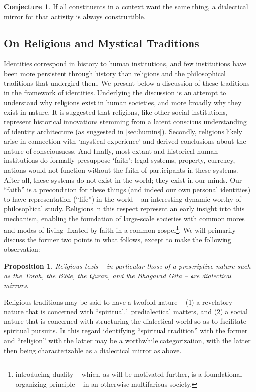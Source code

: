 \documentclass[pra,twocolumn,groupedaddress,10pt]{revtex4}
\newtheorem{proposition}[theorem]{Proposition}
\theoremstyle{definition}
\newtheorem{conjecture}[theorem]{Conjecture}
\begin{document}
\begin{conjecture}
	If all constituents in a context want the same thing, a dialectical mirror for that activity is always constructible.
\end{conjecture}

\subsection{On Religious and Mystical Traditions} \label{sec:phirelhistra}

Identities correspond in history to human institutions, and few institutions have been more persistent through history than religions and the philosophical traditions that undergird them. We present below a discussion of these traditions in the framework of identities. Underlying the discussion is an attempt to understand why religions exist in human societies, and more broadly why they exist in nature. It is suggested that religions, like other social institutions, represent historical innovations stemming from a latent conscious understanding of identity architecture (as suggested in \autoref{sec:humins}). Secondly, religions likely arise in connection with `mystical experience' and derived conclusions about the nature of consciousness. And finally, most extant and historical human institutions do formally presuppose `faith': legal systems, property, currency, nations would not function without the faith of participants in these systems. After all, these systems do not exist in the world; they exist in our minds. Our ``faith'' is a precondition for these things (and indeed our own personal identities) to have representation (``life'') in the world -- an interesting dynamic worthy of philosophical study. Religions in this respect represent an early insight into this mechanism, enabling the foundation of large-scale societies with common mores and modes of living, fixated by faith in a common gospel\footnote{introducing duality -- which, as will be motivated further, is a foundational organizing principle -- in an otherwise multifarious society.}. We will primarily discuss the former two points in what follows, except to make the following observation:

\begin{proposition}
	Religious texts -- in particular those of a prescriptive nature such as the Torah, the Bible, the Quran, and the Bhagavad Gita -- are dialectical mirrors.
\end{proposition}

Religious traditions may be said to have a twofold nature -- (1) a revelatory nature that is concerned with ``spiritual,'' predialectical matters, and (2) a social nature that is concerned with structuring the dialectical world so as to facilitate spiritual pursuits. In this regard identifying ``spiritual tradition'' with the former and ``religion'' with the latter may be a worthwhile categorization, with the latter then being characterizable as a dialectical mirror as above.
\end{document}
